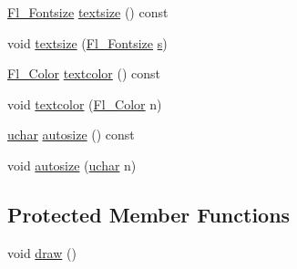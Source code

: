\begin{DoxyCompactItemize}
\item 
\hyperlink{_enumerations_8_h_ad58927f5c691454480f7cd28362502f1}{Fl\+\_\+\+Fontsize} \hyperlink{class_fl___chart_afe7366b51678d90b978f82fb41a83fa0}{textsize} () const
\item 
void \hyperlink{class_fl___chart_a921349938807d1db4255bb182465461c}{textsize} (\hyperlink{_enumerations_8_h_ad58927f5c691454480f7cd28362502f1}{Fl\+\_\+\+Fontsize} \hyperlink{forms_8_h_a672b4f0a8c8a6db61068c721f799d87f}{s})
\item 
\hyperlink{_enumerations_8_h_a8b762953646f8abee866061f1af78a6a}{Fl\+\_\+\+Color} \hyperlink{class_fl___chart_a047a8ef3040ff85c6d022d92e0ef3746}{textcolor} () const
\item 
void \hyperlink{class_fl___chart_adde0ae8bff3349ebfa50c7680a90f3b0}{textcolor} (\hyperlink{_enumerations_8_h_a8b762953646f8abee866061f1af78a6a}{Fl\+\_\+\+Color} n)
\item 
\hyperlink{fl__types_8h_a65f85814a8290f9797005d3b28e7e5fc}{uchar} \hyperlink{class_fl___chart_aac985068654026812efd7df0d0b5a6ff}{autosize} () const
\item 
void \hyperlink{class_fl___chart_a36cf4d6801b88b3cb27b18d3f86e1835}{autosize} (\hyperlink{fl__types_8h_a65f85814a8290f9797005d3b28e7e5fc}{uchar} n)
\end{DoxyCompactItemize}
\subsection*{Protected Member Functions}
\begin{DoxyCompactItemize}
\item 
void \hyperlink{class_fl___chart_a72ec7a85128f8fcac3a306cc90afc876}{draw} ()
\end{DoxyCompactItemize}
